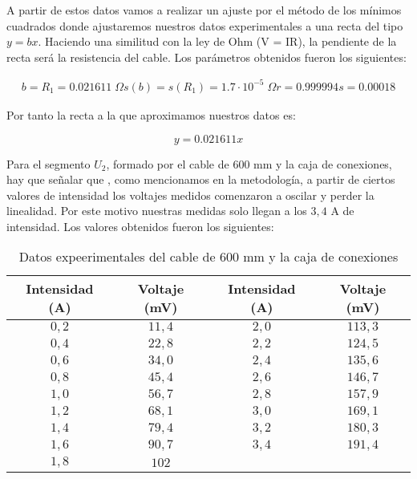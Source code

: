 \documentclass[a4paper,12pt,titlepage]{article}
\begin{document}
A partir de estos datos vamos a realizar un ajuste por el método de los mínimos cuadrados donde ajustaremos nuestros datos experimentales a una recta del tipo $y = bx$. Haciendo una similitud con la ley de Ohm (V = IR), la pendiente de la recta será la resistencia del cable. Los parámetros obtenidos fueron los siguientes:

\begin{equation}
    \begin{gathered}
        b = R_{1}=  0.021611 \; \Omega
        s(b)= s(R_{1}) = 1.7 \cdot 10^{-5} \; \Omega
        r =  0.999994
        s =  0.00018
    \end{gathered}
\end{equation}

Por tanto la recta a la que aproximamos nuestros datos es:

\begin{equation}
    y = 0.021611x
\end{equation}

Para el segmento $U_{2}$, formado por el cable de 600 mm y la caja de conexiones, hay que señalar que , como mencionamos en la metodología, a partir de ciertos valores de intensidad los voltajes medidos comenzaron a oscilar y perder la linealidad. Por este motivo nuestras medidas solo llegan a los $3,4$ A de intensidad. Los valores obtenidos fueron los siguientes:

\begin{table}[h!]
    \centering
    \begin{tabular}{|c|c|c|c|}
        \hline
        Intensidad (A) & Voltaje (mV) & Intensidad (A) & Voltaje (mV) \\
        \hline
        $0,2$ & $11,4$ & $2,0$ & $113,3$ \\
        \hline
        $0,4$ & $22,8$ & $2,2$ & $124,5$ \\
        \hline
        $0,6$ & $34,0$ & $2,4$ & $135,6$ \\
        \hline
        $0,8$ & $45,4$ & $2,6$ & $146,7$ \\
        \hline
        $1,0$ & $56,7$ & $2,8$ & $157,9$ \\
        \hline
        $1,2$ & $68,1$ & $3,0$ & $169,1$ \\
        \hline
        $1,4$ & $79,4$ & $3,2$ & $180,3$ \\
        \hline
        $1,6$ & $90,7$ & $3,4$ & $191,4$ \\
        \hline
        $1,8$ & $102$ &  &  \\
        \hline
    \end{tabular}
    \caption{Datos expeerimentales del cable de 600 mm y la caja de conexiones}
\end{table}
\end{document}
